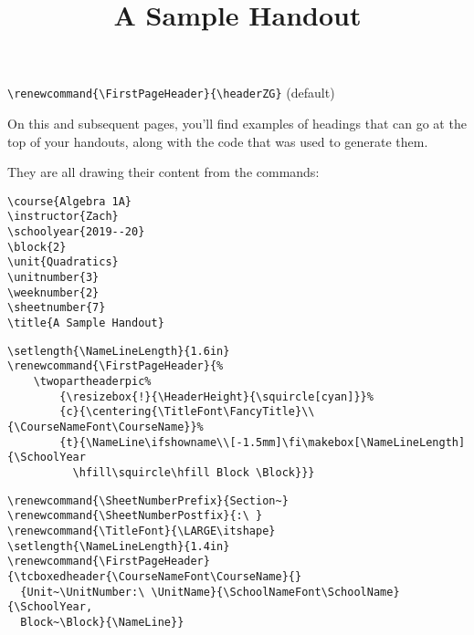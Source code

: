 \documentclass[12pt,twoside,parskip,notitle]{handout}
\title{A Sample Handout}
\begin{document}
\begingroup
\maketitle
\verb|\renewcommand{\FirstPageHeader}{\headerZG}| (default)
\endgroup

\vfill
On this and subsequent pages, you'll find examples of headings that can go at the top of your handouts, along with the code that was used to generate them.

They are all drawing their content from the commands:
\begingroup
\singlespacing
\begin{verbatim}
\course{Algebra 1A}
\instructor{Zach}
\schoolyear{2019--20}
\block{2}
\unit{Quadratics}
\unitnumber{3}
\weeknumber{2}
\sheetnumber{7}
\title{A Sample Handout}
\end{verbatim}
\endgroup
\newpage

\begingroup
\setlength{\NameLineLength}{1.6in}
\renewcommand{\TitleFont}{\Large\bfseries\boldmath}
\renewcommand{\FirstPageHeader}{%
	\twopartheaderpic%
	{\resizebox{!}{\HeaderHeight}{\squircle[cyan]}}%
	{c}{\centering{\TitleFont\FancyTitle}\\{\CourseNameFont\CourseName}}%
	{t}{\NameLine\ifshowname\\[-1.5mm]\fi\makebox[\NameLineLength]{\SchoolYear\hfill\squircle\hfill Block \Block}}}
\maketitle
\singlespacing
\begin{verbatim}
\setlength{\NameLineLength}{1.6in}
\renewcommand{\FirstPageHeader}{%
    \twopartheaderpic%
        {\resizebox{!}{\HeaderHeight}{\squircle[cyan]}}%
        {c}{\centering{\TitleFont\FancyTitle}\\{\CourseNameFont\CourseName}}%
        {t}{\NameLine\ifshowname\\[-1.5mm]\fi\makebox[\NameLineLength]{\SchoolYear
          \hfill\squircle\hfill Block \Block}}}
\end{verbatim}
\endgroup

\newpage

\begingroup
\renewcommand{\SheetNumberPrefix}{Section~}
\renewcommand{\SheetNumberPostfix}{:\ }
\renewcommand{\TitleFont}{\LARGE\itshape}
\setlength{\NameLineLength}{1.4in}
\renewcommand{\FirstPageHeader}{\tcboxedheader{\CourseNameFont\CourseName}{}{Unit~\UnitNumber:\ \UnitName}{\SchoolNameFont\SchoolName}{\SchoolYear, Block~\Block}{\NameLine}}
\maketitle
\singlespacing
\begin{verbatim}
\renewcommand{\SheetNumberPrefix}{Section~}
\renewcommand{\SheetNumberPostfix}{:\ }
\renewcommand{\TitleFont}{\LARGE\itshape}
\setlength{\NameLineLength}{1.4in}
\renewcommand{\FirstPageHeader}{\tcboxedheader{\CourseNameFont\CourseName}{}
  {Unit~\UnitNumber:\ \UnitName}{\SchoolNameFont\SchoolName}{\SchoolYear, 
  Block~\Block}{\NameLine}}
\end{verbatim}
\endgroup
\end{document}
